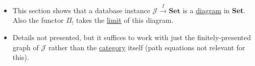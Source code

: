 \begin{itemize}
    \item This section shows that a database instance $\mathcal{J}\xrightarrow{I}\mathbf{Set}$ is a \href{doc/1 math/Seven Sketches in Compositionality/Chapter 3: Databases/5 Introduction to limits and colimits/2 Limits/4 Cone}{diagram} in \textbf{Set}. Also the functor $\Pi_!$ takes the \href{doc/1 math/Seven Sketches in Compositionality/Chapter 3: Databases/5 Introduction to limits and colimits/2 Limits/5 Limit}{limit} of this diagram.
    \item Details not presented, but it suffices to work with just the finitely-presented graph of $\mathcal{J}$ rather than the \href{doc/1 math/Seven Sketches in Compositionality/Chapter 3: Databases/2 Categories/1 Free Categories/1 Category}{category} itself (path equations not relevant for this).
  \end{itemize}

